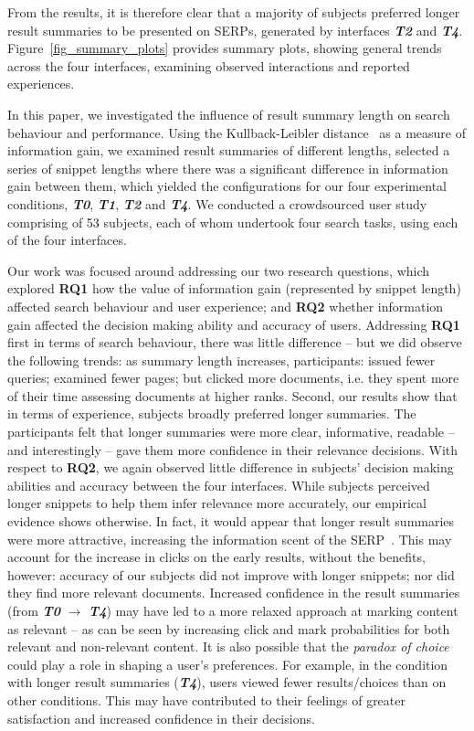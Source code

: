 From the results, it is therefore clear that a majority of subjects preferred longer result summaries to be presented on SERPs, generated by interfaces \textbf{\emph{T2}} and \textbf{\emph{T4}}. Figure~\ref{fig_summary_plots} provides summary plots, showing general trends across the four interfaces, examining observed interactions and reported experiences.

In this paper, we investigated the influence of result summary length on search behaviour and performance. Using the Kullback-Leibler distance~\cite{kullback1951information} as a measure of information gain, we examined result summaries of different lengths, selected a series of snippet lengths where there was a significant difference in information gain between them, which yielded the configurations for our four experimental conditions, \textbf{\emph{T0}}, \textbf{\emph{T1}}, \textbf{\emph{T2}} and \textbf{\emph{T4}}. We conducted a crowdsourced user study comprising of 53 subjects, each of whom undertook four search tasks, using each of the four interfaces.

Our work was focused around addressing our two research questions, which explored \textbf{RQ1} how the value of information gain (represented by snippet length) affected search behaviour and user experience; and \textbf{RQ2} whether information gain affected the decision making ability and accuracy of users. Addressing \textbf{RQ1} first in terms of search behaviour, there was little difference -- but we did observe the following trends: as summary length increases, participants: issued fewer queries; examined fewer pages; but clicked more documents, i.e. they spent more of their time assessing documents at higher ranks. Second, our results show that in terms of experience, subjects broadly preferred longer summaries. The participants felt that longer summaries were more clear, informative, readable -- and interestingly -- gave them more confidence in their relevance decisions. With respect to \textbf{RQ2}, we again observed little difference in subjects' decision making abilities and accuracy between the four interfaces. While subjects perceived longer snippets to help them infer relevance more accurately, our empirical evidence shows otherwise. In fact, it would appear that longer result summaries were more attractive, increasing the information scent of the SERP~\cite{wu2014scent}. This may account for the increase in clicks on the early results, without the benefits, however: accuracy of our subjects did not improve with longer snippets; nor did they find more relevant documents. Increased confidence in the result summaries (from \textbf{\emph{T0}} $\rightarrow$ \textbf{\emph{T4}}) may have led to a more relaxed approach at marking content as relevant -- as can be seen by increasing click and mark probabilities for both relevant and non-relevant content. It is also possible that the \emph{paradox of choice}~\cite{oulasvirta2009serp_size} could play a role in shaping a user's preferences. For example, in the condition with longer result summaries (\textbf{\emph{T4}}), users viewed fewer results/choices than on other conditions. This may have contributed to their feelings of greater satisfaction and  increased confidence in their decisions.

